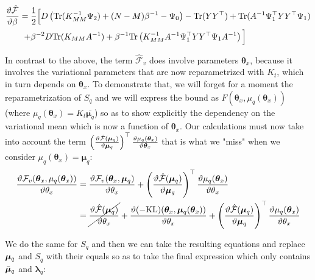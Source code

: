 \documentclass{article} %
\begin{document}
\begin{align}
\frac{\vartheta \hat{\mathcal{F}}}{\vartheta \beta} ={}&
  \frac{1}{2} \Big[ 
      D \left( \text{Tr}(K_{MM}^{-1} \Psi_2) + (N-M)\beta^{-1} - \Psi_0 \right) - \text{Tr}(Y Y^{\top})
	  + \text{Tr}(A^{-1}\Psi_1^{\top} Y Y^{\top} \Psi_1) \nonumber \\
   +{}& \beta^{-2} D \text{Tr} ( K_{MM} A^{-1} ) + \beta^{-1} \text{Tr} \left( K_{MM}^{-1} A^{-1} \Psi_1^{\top} Y Y^{\top} \Psi_1 A^{-1} \right) \Big]
\label{derivb2}
\end{align}


In contrast to the above, the term $\hat{\mathcal{F}}_v$ does involve parameters $\boldsymbol \theta_x$, because it involves the variational parameters that are now reparametrized with $K_t$, which in turn depends on $\boldsymbol \theta_x$. 
To demonstrate that, we will forget for a moment the reparametrization of $S_q$ and we will express the bound as $F(\boldsymbol \theta_x, \mu_q (\boldsymbol \theta_x))$ (where $\mu_q (\boldsymbol \theta_x) = K_t \bar{\boldsymbol \mu_q}$) so as to show explicitly the dependency on the variational mean which is now a function of $\boldsymbol \theta_x$. Our calculations must now take into account the term
$
\left( \frac{\vartheta \hat{\mathcal{F}}(\boldsymbol \mu_q)}{\vartheta \boldsymbol \mu_q} \right)^{\top}
       \frac{\vartheta \mu_q (\boldsymbol \theta_x)}{\vartheta \boldsymbol \theta_x}
$
that is what we "miss" when we consider $\mu_q(\boldsymbol \theta_x) = \boldsymbol \mu_q$:
\begin{align}
\frac{\vartheta \mathcal{F}_v(\boldsymbol \theta_x, \mu_q(\boldsymbol \theta_x))}{\vartheta \theta_x} = {}&
	\frac{\vartheta \mathcal{F}_v(\boldsymbol \theta_x, \boldsymbol \mu_q)}{\vartheta \theta_x} 
  +  \left( \frac{\vartheta \hat{\mathcal{F}}(\boldsymbol \mu_q)}{\vartheta \boldsymbol \mu_q} \right)^{\top}
            \frac{\vartheta \mu_q(\boldsymbol \theta_x)}{\vartheta \theta_x} \nonumber \\
= {}&
 \cancel{
    \frac{\vartheta \hat{\mathcal{F}}(\boldsymbol \mu_q)}{\vartheta \theta_x}
  } +
  \frac{\vartheta (-\text{KL})(\boldsymbol \theta_x, \boldsymbol \mu_q(\boldsymbol \theta_x))}{\vartheta \theta_x}
+  \left( \frac{\vartheta \hat{\mathcal{F}}(\boldsymbol \mu_q)}{\vartheta \boldsymbol \mu_q} \right)^{\top}
            \frac{\vartheta \mu_q(\boldsymbol \theta_x)}{\vartheta \theta_x}
\label{meanReparamDerivFTheta}
\end{align}

We do the same for $S_q$ and then we can take the resulting equations and replace $\boldsymbol \mu_q$ and $S_q$ with their equals so as to take the final expression which only contains $\bar{\boldsymbol \mu}_q$ and $\boldsymbol \lambda_q$:
\end{document}
